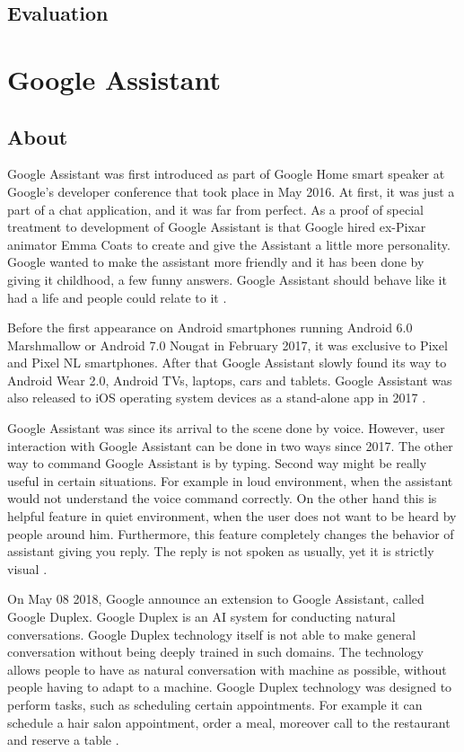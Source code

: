 \documentclass[
  digital, %
  oneside, %
  table,   %
  lof,     %
  lot,     %
]{fithesis3}
\begin{document}
\section{Evaluation}

\chapter{Google Assistant}\label{ch:google}
\section{About}

Google Assistant was first introduced as part of Google Home smart speaker at Google's developer conference that took place in May 2016. At first, it was just a part of a chat application, and it was far from perfect. As a proof of special treatment to development of Google Assistant is that Google hired ex-Pixar animator Emma Coats to create and give the Assistant a little more personality. Google wanted to make the assistant more friendly and it has been done by giving it childhood, a few funny answers. Google Assistant should behave like it had a life and people could relate to it \parencite{google_childhood}.

Before the first appearance on Android smartphones running Android 6.0 Marshmallow or Android 7.0 Nougat in February 2017, it was exclusive to Pixel and Pixel NL smartphones. After that Google Assistant slowly found its way to Android Wear 2.0, Android TVs, laptops, cars and tablets. Google Assistant was also released to iOS operating system devices as a stand-alone app in 2017 \parencite{google_ios}.

Google Assistant was since its arrival to the scene done by voice. However, user interaction with Google Assistant can be done in two ways since 2017. The other way to command Google Assistant is by typing. Second way might be really useful in certain situations. For example in loud environment, when the assistant would not understand the voice command correctly. On the other hand this is helpful feature in quiet environment, when the user does not want to be heard by people around him. Furthermore, this feature completely changes the behavior of assistant giving you reply. The reply is not spoken as usually, yet it is strictly visual \parencite{google_type}.

On May 08 2018, Google announce an extension to Google Assistant, called Google Duplex. Google Duplex is an AI system for conducting natural conversations. Google Duplex technology itself is not able to make general conversation without being deeply trained in such domains. The technology allows people to have as natural conversation with machine as possible, without people having to adapt to a machine. Google Duplex technology was designed to perform tasks, such as scheduling certain appointments. For example it can schedule a hair salon appointment, order a meal, moreover call to the restaurant and reserve a table \parencite{google_duplex}.
\end{document}
